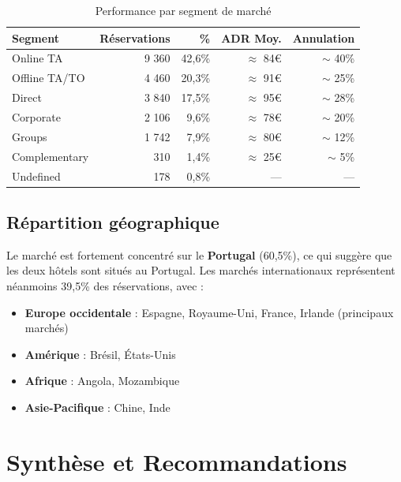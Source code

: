 \documentclass[12pt,a4paper]{article}
\begin{document}
\begin{table}[h!]
  \centering
  \caption{Performance par segment de marché}
  \begin{tabular}{lrrrr}
    \toprule
    \textbf{Segment} & \textbf{Réservations} & \textbf{\%} & \textbf{ADR Moy.} & \textbf{Annulation} \\
    \midrule
    Online TA        & 9 360 & 42,6\% & $\approx$ 84€ & $\sim$ 40\% \\
    Offline TA/TO    & 4 460 & 20,3\% & $\approx$ 91€ & $\sim$ 25\% \\
    Direct           & 3 840 & 17,5\% & $\approx$ 95€ & $\sim$ 28\% \\
    Corporate        & 2 106 &  9,6\% & $\approx$ 78€ & $\sim$ 20\% \\
    Groups           & 1 742 &  7,9\% & $\approx$ 80€ & $\sim$ 12\% \\
    Complementary    &   310 &  1,4\% & $\approx$ 25€ & $\sim$ 5\%  \\
    Undefined        &   178 &  0,8\% & ---           & ---         \\
    \bottomrule
  \end{tabular}
\end{table}

\subsection{Répartition géographique}

Le marché est fortement concentré sur le \textbf{Portugal} (60,5\%), ce qui suggère que les deux hôtels sont situés au Portugal. Les marchés internationaux représentent néanmoins 39,5\% des réservations, avec :

\begin{itemize}
  \item \textbf{Europe occidentale} : Espagne, Royaume-Uni, France, Irlande (principaux marchés)
  \item \textbf{Amérique} : Brésil, États-Unis
  \item \textbf{Afrique} : Angola, Mozambique
  \item \textbf{Asie-Pacifique} : Chine, Inde
\end{itemize}

\newpage

\section{Synthèse et Recommandations}
\end{document}
